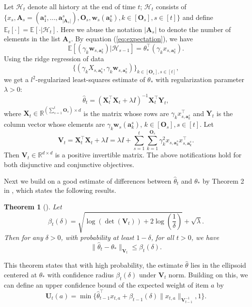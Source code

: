 \documentclass{article}
\newcommand{\EE}{\mathbb{E}}
\newcommand{\RR}{\mathbb{R}}
\newcommand{\bA}{\mathbf{A}}
\newcommand{\ba}{\mathbf{a}}
\newcommand{\bO}{\mathbf{O}}
\newcommand{\bU}{\mathbf{U}}
\newcommand{\bV}{\mathbf{V}}
\newcommand{\bw}{\mathbf{w}}
\newcommand{\bX}{\mathbf{X}}
\newcommand{\bY}{\mathbf{Y}}
\newcommand{\cH}{\mathcal{H}}
\newcommand{\abs}[1]{\left| #1 \right|}
\newcommand{\norm}[1]{\| #1 \|}
\newtheorem{theorem}{Theorem}[section]
\begin{document}
Let $\cH_t$ denote all history at the end of time $t$; $\cH_t$ consists of $\{x_s, \bA_s = (\ba_{1}^s,...,\ba_{\abs{\bA_s}}^s), \bO_s, \bw_s(\ba_k^s), k \in[\bO_s], s\in[t] \}$ and define $\EE_t[\cdot] = \EE[\cdot | \cH_t]$. Here we abuse the notation $\abs{\bA_s}$ to denote the number of elements in the list $\bA_s$. By equation (\ref{eq:expectation}), we have 
$$
\EE[(\gamma_k \bw_{s,\ba_k^s}) | \cH_{s-1}] = \theta_*^{\top} (\gamma_k x_{s,\ba_k^s}).
$$
Using the ridge regression of data 
$$
\{(\gamma_k X_{s,\ba_k^s}, \gamma_k \bw_{s,\ba_k^s})\}_{k \in[\bO_s], s\in[t]},
$$
we get a $l^2$-regularized least-squares estimate of $\theta_*$ with regularization parameter $\lambda > 0$:
\begin{equation}
\hat{\theta}_t = (\bX_t^{\top}\bX_t + \lambda I)^{-1} \bX_t^{\top} \bY_t,
\end{equation}
where $\bX_t \in \RR^{(\sum_{s=1}^{t}\bO_s) \times d}$ is the matrix whose rows are $\gamma_k x_{s,\ba_k^s}^{\top}$ and $\bY_t$ is the column vector whose elements are $\gamma_k \bw_s(\ba_k^s)$, $k \in[\bO_s], s\in[t]$. Let
$$
\bV_t = \bX_t^{\top} \bX_t + \lambda I = \lambda I + \sum_{s=1}^{t} \sum_{k=1}^{\bO_s} \gamma_k^2 x_{s,\ba_k^s}x_{s,\ba_k^s}^{\top}.
$$
Then $\bV_t \in \RR^{d \times d}$ is a positive invertible matrix. The above notifications hold for both disjunctive and conjunctive objectives.

Next we build on a good estimate of differences between $\hat{\theta}_t$ and $\theta_*$ by Theorem 2 in \cite{abbasi2011improved}, which states the following results.
	
\begin{theorem}[\cite{abbasi2011improved}]
\label{thm:theta_estimate}
Let 
$$
\beta_{t}(\delta) = \sqrt{\log(\det(\bV_{t})) + 2 \log(\frac{1}{\delta})} + \sqrt{\lambda}.
$$
Then for any $\delta > 0$, with probability at least $1 - \delta$, for all $t > 0$, we have
\begin{equation}
\label{eq:estimateTheta}
\norm{\hat{\theta}_t - \theta_{\ast}}_{\bV_{t}} \leq \beta_{t}(\delta).
\end{equation}
\end{theorem}

This theorem states that with high probability, the estimate $\hat{\theta}$ lies in the ellipsoid centered at $\theta_*$  with confidence radius $\beta_t(\delta)$ under $\bV_t$ norm. Building on this, we can define an upper confidence bound of the expected weight of item $a$ by
\begin{equation}
\bU_t(a) = \min\{\hat{\theta}_{t-1}^{\top}x_{t,a} + \beta_{t-1}(\delta)\norm{x_{t,a}}_{\bV_{t-1}^{-1}}, 1\}.
\end{equation}
\end{document}
